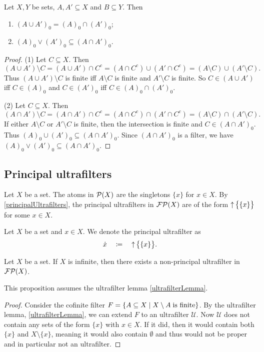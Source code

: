 \begin{proposition}
Let $X,Y$ be sets, $A, A'\subseteq X$ and $B\subseteq Y$. Then
\begin{enumerate}
\item $(A\cup A')_0 = (A)_0 \cap (A')_0$;
\item $(A)_0 \vee (A')_0 \subseteq (A\cap A')_0$.
\end{enumerate}
\end{proposition}
\begin{proof}
(1) Let $C\subseteq X$. Then
\[ (A\cup A')\setminus C = (A\cup A')\cap C^c = (A\cap C^c) \cup (A'\cap C^c) = (A\setminus C)\cup (A'\setminus C). \]
Thus $(A\cup A')\setminus C$ is finite iff $A\setminus C$ is finite and $A'\setminus C$ is finite. So $C\in (A\cup A')$ iff $C\in (A)_0$ and $C\in (A')_0$ iff $C\in (A)_0\cap (A')_0$.

(2) Let $C\subseteq X$. Then
\[ (A\cap A')\setminus C = (A\cap A')\cap C^c = (A\cap C^c) \cap (A'\cap C^c) = (A\setminus C)\cap (A'\setminus C). \]
If either $A\setminus C$ or $A'\setminus C$ is finite, then the intersection is finite and $C\in (A\cap A')_0$. Thus $(A)_0 \cup (A')_0 \subseteq (A\cap A')_0$. Since $(A\cap A')_0$ is a filter, we have $(A)_0 \vee (A')_0 \subseteq (A\cap A')_0$. 
\end{proof}

\subsection{Principal ultrafilters}
Let $X$ be a set. The atoms in $\operatorname{\mathcal{P}}(X)$ are the singletons $\{x\}$ for $x\in X$. By \ref{principalUltrafilters}, the principal ultrafilters in $\operatorname{\mathcal{FP}}(X)$ are of the form $\operatorname{\uparrow}\big\{\{x\}\big\}$ for some $x\in X$.

\begin{definition}
Let $X$ be a set and $x\in X$. We denote the principal ultrafilter as
\[ \dot{x} \quad \coloneqq \quad \operatorname{\uparrow}\big\{\{x\}\big\}. \]
\end{definition}


\begin{proposition}
Let $X$ be a set. If $X$ is infinite, then there exists a non-principal ultrafilter in $\operatorname{\mathcal{FP}}(X)$.
\end{proposition}
This proposition assumes the ultrafilter lemma \ref{ultrafilterLemma}.
\begin{proof}
Consider the cofinite filter $F = \setbuilder{A\subseteq X}{X\setminus A\;\text{is finite}}$. By the ultrafilter lemma, \ref{ultrafilterLemma}, we can extend $F$ to an ultrafilter $\mathcal{U}$. Now $\mathcal{U}$ does not contain any sets of the form $\{x\}$ with $x\in X$. If it did, then it would contain both $\{x\}$ and $X\setminus\{x\}$, meaning it would also contain $\emptyset$ and thus would not be proper and in particular not an ultrafilter.
\end{proof}

